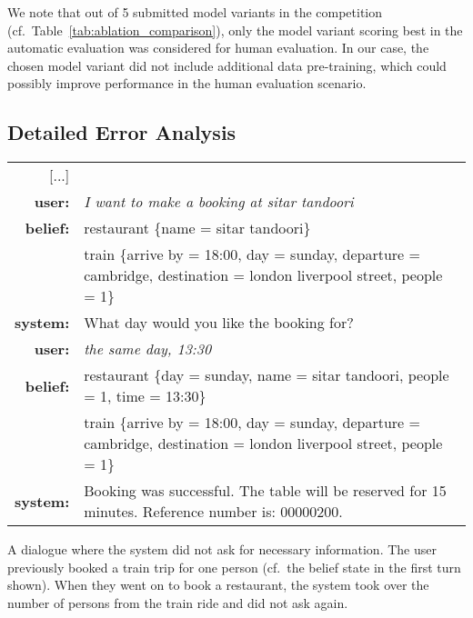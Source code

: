 \documentclass[11pt,a4paper]{article}
\begin{document}
We note that out of 5 submitted model variants in the competition (cf.~Table~\ref{tab:ablation_comparison}), only the model variant scoring best in the automatic evaluation was considered for human evaluation.
In our case, the chosen model variant did not include additional data pre-training, which could possibly improve performance in the human evaluation scenario.





\subsection{Detailed Error Analysis}

\begin{example}[h!]
\small
\setlength{\tabcolsep}{2pt}
\begin{mdframed}[style=ExampleFrame]
\begin{tabularx}{\textwidth}{rX}
[...] \\
\bf user: & \it I want to make a booking at sitar tandoori \\
\bf belief: & restaurant \{name = sitar tandoori\} \\
& train \{arrive by = 18:00, day = sunday, departure = cambridge, destination = london liverpool street, people = 1\} \\
\bf system: & What day would you like the booking for? \\
\bf user: & \it the same day, 13:30 \\
\bf belief: & restaurant \{day = sunday, name = sitar tandoori, people = 1, time = 13:30\} \\
& train \{arrive by = 18:00, day = sunday, departure = cambridge, destination = london liverpool street, people = 1\} \\
\bf system: & Booking was successful. The table will be reserved for 15 minutes. Reference number is: 00000200. \\
\end{tabularx}
\end{mdframed}
\caption{A dialogue where the system did not ask for necessary information. The user previously booked a train trip for one person (cf.~the belief state in the first turn shown). When they went on to book a restaurant, the system took over the number of persons from the train ride and did not ask again.\label{ex:error1}}
\end{example}
\end{document}
